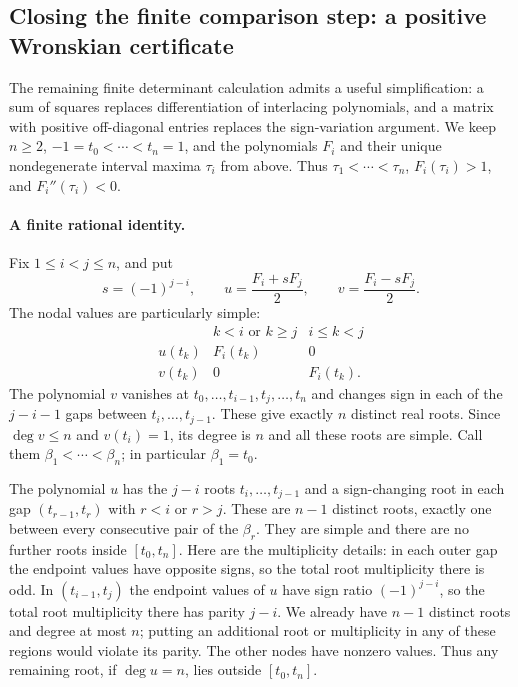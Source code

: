 \documentclass[11pt]{article}
\theoremstyle{remark}\newtheorem{remark}[theorem]{Remark}
\begin{document}
\subsection{Closing the finite comparison step: a positive Wronskian certificate}
\label{polyretry:finite-comparison}

The remaining finite determinant calculation admits a useful
simplification: a sum of squares replaces differentiation of
interlacing polynomials, and a matrix with positive off-diagonal
entries replaces the sign-variation argument.  We keep
$n\ge2$, $-1=t_0<\cdots<t_n=1$, and the polynomials $F_i$ and
their unique nondegenerate interval maxima $\tau_i$ from above.
Thus $\tau_1<\cdots<\tau_n$,
$F_i(\tau_i)>1$, and $F_i''(\tau_i)<0$.

\paragraph{A finite rational identity.}
Fix $1\le i<j\le n$, and put
\[
 s=(-1)^{j-i},\qquad
 u=\frac{F_i+sF_j}{2},\qquad
 v=\frac{F_i-sF_j}{2}.
\]
The nodal values are particularly simple:
\[
 \begin{array}{c|cc}
 &k<i\text{ or }k\ge j&i\le k<j\\ \hline
 u(t_k)&F_i(t_k)&0\\
 v(t_k)&0&F_i(t_k).
 \end{array}
\]
The polynomial $v$ vanishes at
$t_0,\ldots,t_{i-1},t_j,\ldots,t_n$ and changes sign in each
of the $j-i-1$ gaps between $t_i,\ldots,t_{j-1}$.
These give exactly $n$ distinct real roots.  Since $\deg v\le n$
and $v(t_i)=1$, its degree is $n$ and all these roots are simple.
Call them $\beta_1<\cdots<\beta_n$; in particular $\beta_1=t_0$.

The polynomial $u$ has the $j-i$ roots
$t_i,\ldots,t_{j-1}$ and a sign-changing root in each gap
$(t_{r-1},t_r)$ with $r<i$ or $r>j$.  These are $n-1$
distinct roots, exactly one between every consecutive pair of
the $\beta_r$.  They are simple and there are no further roots
inside $[t_0,t_n]$.  Here are the multiplicity details: in each
outer gap the endpoint values have opposite signs, so the total
root multiplicity there is odd.  In $(t_{i-1},t_j)$ the endpoint
values of $u$ have sign ratio $(-1)^{j-i}$, so the total root
multiplicity there has parity $j-i$.  We already have $n-1$
distinct roots and degree at most $n$; putting an additional root
or multiplicity in any of these regions would violate its parity.
The other nodes have nonzero values.  Thus any remaining root,
if $\deg u=n$, lies outside $[t_0,t_n]$.
\end{document}
